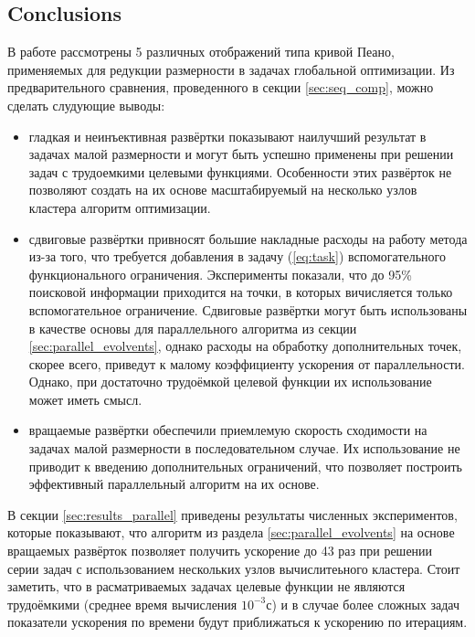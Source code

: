 \documentclass[runningheads]{llncs}
\begin{document}
\begin{Russian}
\section{Conclusions}
В работе рассмотрены 5 различных отображений типа кривой Пеано, применяемых для редукции размерности в задачах глобальной оптимизации.
Из предварительного сравнения, проведенного в секции \ref{sec:seq_comp}, можно сделать слудующие выводы:
\begin{itemize}
  \item гладкая и неинъективная развёртки показывают наилучший результат в задачах малой размерности и могут быть успешно применены при решении задач с трудоемкими целевыми функциями. Особенности этих развёрток не позволяют создать на их основе масштабируемый на несколько узлов кластера алгоритм оптимизации.
  \item сдвиговые развёртки привносят большие накладные расходы на работу метода из-за того, что требуется добавления в задачу (\ref{eq:task}) вспомогательного функционального ограничения. Эксперименты показали, что до 95\% поисковой информации приходится на точки, в которых вичисляется только вспомогательное ограничение. Сдвиговые развёртки могут быть использованы в качестве основы для параллельного алгоритма из секции \ref{sec:parallel_evolvents}, однако расходы на обработку дополнительных точек, скорее всего, приведут к малому коэффициенту ускорения от параллельности. Однако, при достаточно трудоёмкой целевой функции их использование может иметь смысл.
  \item вращаемые развёртки обеспечили приемлемую скорость сходимости на задачах малой размерности в последовательном случае. Их использование не приводит к введению дополнительных ограничений, что позволяет построить эффективный параллельный алгоритм на их основе.
\end{itemize}

В секции \ref{sec:results_parallel} приведены результаты численных экспериментов, которые показывают, что алгоритм из раздела \ref{sec:parallel_evolvents} на основе вращаемых развёрток позволяет получить ускорение до 43 раз при решении серии задач с использованием нескольких узлов вычислитеьного кластера. Стоит заметить, что в расматриваемых задачах целевые функции не являются трудоёмкими (среднее время вычисления $10^{-3}$с) и в случае более сложных задач показатели ускорения по времени будут приближаться к ускорению по итерациям.
\end{Russian}
\end{document}

